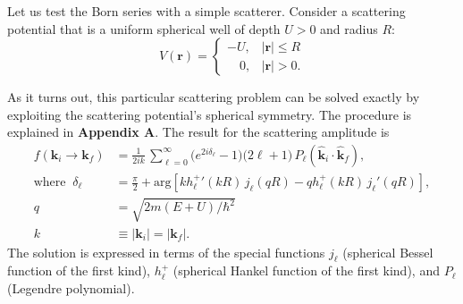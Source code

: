 \documentclass[pra,12pt]{revtex4-2}
\begin{document}
Let us test the Born series with a simple scatterer.  Consider a
scattering potential that is a uniform spherical well of depth $U > 0$
and radius $R$:
\begin{equation}
  V(\mathbf{r}) = \begin{cases}-U, & |\mathbf{r}| \le R \\ \;\;\;\,0,
    & |\mathbf{r}| > 0. \end{cases}
\end{equation}

As it turns out, this particular scattering problem can be solved
exactly by exploiting the scattering potential's spherical symmetry.
The procedure is explained in \textbf{Appendix A}.  The result for the
scattering amplitude is
\begin{equation}
  \begin{aligned}f(\mathbf{k}_i \rightarrow \mathbf{k}_f) &= \frac{1}{2ik}\, \sum_{\ell =0}^\infty \big(e^{2i\delta_\ell} - 1\big) \big(2\ell+1\big)\, P_{\ell}(\hat{\mathbf{k}}_i\cdot \hat{\mathbf{k}}_f), \\ \mathrm{where}\;\; \delta_\ell &= \frac{\pi}{2} + \mathrm{arg}\!\left[k {h_\ell^+}'(kR) \, j_\ell(qR) - qh_\ell^+(kR)\, j_\ell'(qR)\right], \\ q &= \sqrt{2m(E+U)/\hbar^2} \\ k &\equiv |\mathbf{k}_i| = |\mathbf{k}_f|.\end{aligned}
  \label{fresult_well}
\end{equation}
The solution is expressed in terms of the special functions $j_\ell$
(spherical Bessel function of the first kind), $h_\ell^+$ (spherical
Hankel function of the first kind), and $P_\ell$ (Legendre
polynomial).
\end{document}
